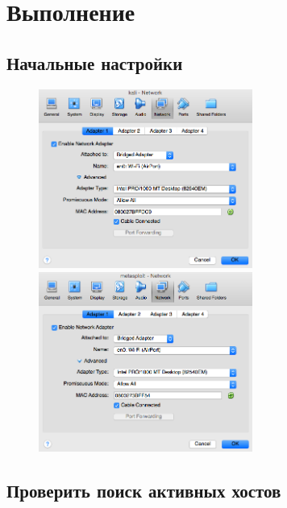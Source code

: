 \documentclass[utf8x, 12pt]{G7-32}
\begin{document}
\chapter{Выполнение}


\section{Начальные настройки}

\begin{figure}[hhh!]
	\begin{center}
		\includegraphics[width=7cm]{img/kali}
		\includegraphics[width=7cm]{img/metasploit}
	\end{center}
\end{figure}




\newpage
\section{Проверить поиск активных хостов}
\end{document}
